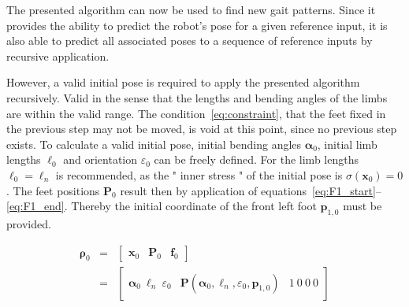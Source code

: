 \documentclass[letterpaper,10pt,conference]{ieeeconf}  %
\begin{document}
The presented algorithm can now be used to find new gait patterns.
Since it provides the ability to predict the robot's pose for a given reference input, it is also able to predict all associated poses to a sequence of reference inputs by recursive application.


However, a valid initial pose is required to apply the presented algorithm recursively.
Valid in the sense that the lengths and bending angles of the limbs are within the valid range.
The condition~\eqref{eq:constraint}, that the feet fixed in the previous step may not be moved, is void at this point, since no previous step exists.
To calculate a valid initial pose, initial bending angles $\bm{\alpha}_0$, initial limb lengths $\bm{\ell}_0$ and orientation $\varepsilon_0$ can be freely defined.
For the limb lengths $\bm{\ell}_0 = \bm{\ell}_n$ is recommended, as the " inner stress " of the initial pose is $\sigma(\bm{x}_0) = 0$.
The feet positions $\bm{P}_0$ result then by application of equations~\eqref{eq:F1_start}--\eqref{eq:F1_end}.
Thereby the initial coordinate of the front left foot $\bm{p}_{1,0}$ must be provided.


\begin{equation}
\begin{array}{ccl}
\bm{\rho}_0 &=& 
\left[
\begin{array}{c|c|c}
\bm{x}_0 & \bm{P}_0 & \bm{f}_0
\end{array}
\right] \\
&=&
\left[
\begin{array}{c|c|c}
\bm{\alpha}_0 ~ \bm{\ell}_n ~ \varepsilon_0  & 
\bm{P}(\bm{\alpha}_0, \bm{\ell}_n, \varepsilon_0, \bm{p}_{1,0}) & 
1~0~0~0
\end{array}
\right]
\end{array}
\end{equation}
\end{document}
